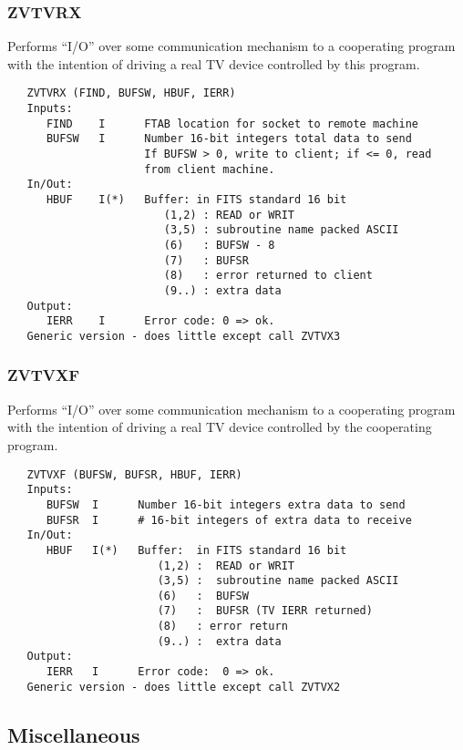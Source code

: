 \subsubsection{ZVTVRX}
Performs ``I/O'' over some communication mechanism to a
cooperating program with the intention of driving a real TV device
controlled by this program.
\begin{verbatim}
   ZVTVRX (FIND, BUFSW, HBUF, IERR)
   Inputs:
      FIND    I      FTAB location for socket to remote machine
      BUFSW   I      Number 16-bit integers total data to send
                     If BUFSW > 0, write to client; if <= 0, read
                     from client machine.
   In/Out:
      HBUF    I(*)   Buffer: in FITS standard 16 bit
                        (1,2) : READ or WRIT
                        (3,5) : subroutine name packed ASCII
                        (6)   : BUFSW - 8
                        (7)   : BUFSR
                        (8)   : error returned to client
                        (9..) : extra data
   Output:
      IERR    I      Error code: 0 => ok.
   Generic version - does little except call ZVTVX3
\end{verbatim}

\subsubsection{ZVTVXF}
Performs ``I/O'' over some communication mechanism to a
cooperating program with the intention of driving a real TV device
controlled by the cooperating program.
\begin{verbatim}
   ZVTVXF (BUFSW, BUFSR, HBUF, IERR)
   Inputs:
      BUFSW  I      Number 16-bit integers extra data to send
      BUFSR  I      # 16-bit integers of extra data to receive
   In/Out:
      HBUF   I(*)   Buffer:  in FITS standard 16 bit
                       (1,2) :  READ or WRIT
                       (3,5) :  subroutine name packed ASCII
                       (6)   :  BUFSW
                       (7)   :  BUFSR (TV IERR returned)
                       (8)   : error return
                       (9..) :  extra data
   Output:
      IERR   I      Error code:  0 => ok.
   Generic version - does little except call ZVTVX2
\end{verbatim}

\subsection{Miscellaneous }

